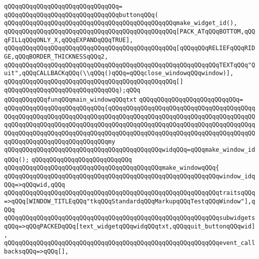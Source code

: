 \verb|qQQqqQQqqQQqqQQqqQQqqQQqqQQqqQQq=|\newline
\verb|qQQqqQQqqQQqqQQqqQQqqQQqqQQqqQQqbuttonqQQq(|\newline
\verb|qQQqqQQqqQQqqQQqqQQqqQQqqQQqqQQqqQQqqQQqqQQqqQQqmake_widget_id(),|\newline
\verb|qQQqqQQqqQQqqQQqqQQqqQQqqQQqqQQqqQQqqQQqqQQqqQQq[PACK_ATqQQqBOTTOM,qQQqFILLqQQqONLY_X,qQQqEXPANDqQQqTRUE],|\newline
\verb|qQQqqQQqqQQqqQQqqQQqqQQqqQQqqQQqqQQqqQQqqQQqqQQq[qQQqqQQqRELIEFqQQqRIDGE,qQQqBORDER_THICKNESSqQQq2,|\newline
\verb|qQQqqQQqqQQqqQQqqQQqqQQqqQQqqQQqqQQqqQQqqQQqqQQqqQQqqQQqqQQqTEXTqQQq"Quit",qQQqCALLBACKqQQq(\\qQQq()qQQq=qQQqclose_windowqQQqwindow)],|\newline
\verb|qQQqqQQqqQQqqQQqqQQqqQQqqQQqqQQqqQQqqQQqqQQqqQQq[]|\newline
\verb|qQQqqQQqqQQqqQQqqQQqqQQqqQQqqQQq);qQQq|\newline
\newline
\newline
\verb|qQQqqQQqqQQqfunqQQqmain_windowqQQqtxt|\newline
\verb|qQQqqQQqqQQqqQQqqQQqqQQqqQQq=|\newline
\verb|qQQqqQQqqQQqqQQqqQQqqQQqqQQq{qQQqqQQqqQQqqQQqqQQqqQQqqQQqqQQqqQQqqQQqqQQqqQQqqQQqqQQqqQQqqQQqqQQqqQQqqQQqqQQqqQQqqQQqqQQqqQQqqQQqqQQqqQQqqQQqqQQqqQQqqQQqqQQqqQQqqQQqqQQqqQQqqQQqqQQqqQQqqQQqqQQqqQQqqQQqqQQqqQQqqQQqqQQqqQQqqQQqqQQqqQQqqQQqqQQqqQQqqQQqqQQqqQQqqQQqqQQqqQQqqQQqqQQqqQQqqQQqqQQqqQQqqQQqqQQqqQQqqQQqmy|\newline
\verb|qQQqqQQqqQQqqQQqqQQqqQQqqQQqqQQqqQQqqQQqqQQqwidqQQq=qQQqmake_window_idqQQq();|\newline
\verb|qQQqqQQqqQQqqQQqqQQqqQQqqQQq|\newline
\verb|qQQqqQQqqQQqqQQqqQQqqQQqqQQqqQQqqQQqqQQqqQQqmake_windowqQQq{|\newline
\verb|qQQqqQQqqQQqqQQqqQQqqQQqqQQqqQQqqQQqqQQqqQQqqQQqqQQqqQQqqQQqwindow_idqQQq=>qQQqwid,qQQq|\newline
\verb|qQQqqQQqqQQqqQQqqQQqqQQqqQQqqQQqqQQqqQQqqQQqqQQqqQQqqQQqqQQqtraitsqQQq=>qQQq[WINDOW_TITLEqQQq"tkqQQqStandardqQQqMarkupqQQqTestqQQqWindow"],qQQq|\newline
\verb|qQQqqQQqqQQqqQQqqQQqqQQqqQQqqQQqqQQqqQQqqQQqqQQqqQQqqQQqqQQqsubwidgetsqQQq=>qQQqPACKEDqQQq[text_widgetqQQqwidqQQqtxt,qQQqquit_buttonqQQqwid],|\newline
\verb|qQQqqQQqqQQqqQQqqQQqqQQqqQQqqQQqqQQqqQQqqQQqqQQqqQQqqQQqqQQqevent_callbacksqQQq=>qQQq[],|\newline

